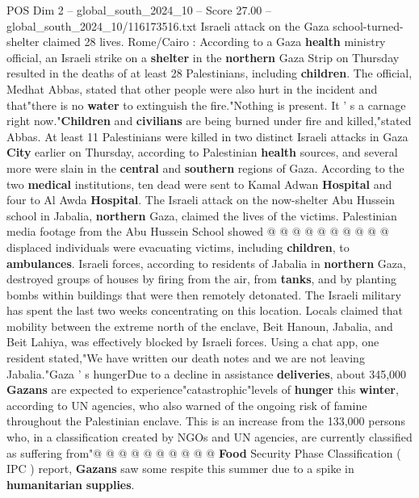 \begin{textsample}{POS Dim 2 – global\_south\_2024\_10 – Score 27.00 – global\_south\_2024\_10/116173516.txt}  \label{ex:f2_pos_138}
Israeli attack on the Gaza school-turned-shelter claimed 28 lives.
Rome/Cairo : According to a Gaza \textbf{health} ministry official, an Israeli strike on a \textbf{shelter} in the \textbf{northern} Gaza Strip on Thursday resulted in the deaths of at least 28 Palestinians, including \textbf{children}.
The official, Medhat Abbas, stated that other people were also hurt in the incident and that"there is no \textbf{water} to extinguish the fire."Nothing is present.
It ' s a carnage right now."\textbf{Children} and \textbf{civilians} are being burned under fire and killed,"stated Abbas.
At least 11 Palestinians were killed in two distinct Israeli attacks in Gaza \textbf{City} earlier on Thursday, according to Palestinian \textbf{health} sources, and several more were slain in the \textbf{central} and \textbf{southern} regions of Gaza.
According to the two \textbf{medical} institutions, ten dead were sent to Kamal Adwan \textbf{Hospital} and four to Al Awda \textbf{Hospital}.
The Israeli attack on the now-shelter Abu Hussein school in Jabalia, \textbf{northern} Gaza, claimed the lives of the victims.
Palestinian media footage from the Abu Hussein School showed @ @ @ @ @ @ @ @ @ @ displaced individuals were evacuating victims, including \textbf{children}, to \textbf{ambulances}.
Israeli forces, according to residents of Jabalia in \textbf{northern} Gaza, destroyed groups of houses by firing from the air, from \textbf{tanks}, and by planting bombs within buildings that were then remotely detonated.
The Israeli military has spent the last two weeks concentrating on this location.
Locals claimed that mobility between the extreme north of the enclave, Beit Hanoun, Jabalia, and Beit Lahiya, was effectively blocked by Israeli forces.
Using a chat app, one resident stated,"We have written our death notes and we are not leaving Jabalia."Gaza ' s hungerDue to a decline in assistance \textbf{deliveries}, about 345,000 \textbf{Gazans} are expected to experience"catastrophic"levels of \textbf{hunger} this \textbf{winter}, according to UN agencies, who also warned of the ongoing risk of famine throughout the Palestinian enclave.
This is an increase from the 133,000 persons who, in a classification created by NGOs and UN agencies, are currently classified as suffering from"@ @ @ @ @ @ @ @ @ @ \textbf{Food} Security Phase Classification ( IPC ) report, \textbf{Gazans} saw some respite this summer due to a spike in \textbf{humanitarian} \textbf{supplies}.

\end{textsample}
